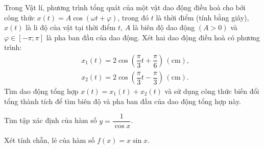 \begin{bt}%
	Trong Vật lí, phương trình tổng quát của một vật dao động điều hoà cho bởi công thức $x(t)=A \cos (\omega t+\varphi)$, trong đó $t$ là thời điểm (tính bằng giây), $x(t)$ là li độ của vật tại thời điểm $t$, $A$ là biên độ dao động $(A>0)$ và $\varphi \in[-\pi ; \pi]$ là pha ban đầu của dao động. Xét hai dao động điều hoà có phương trình:
	$$
	\begin{aligned}
		& x_1(t)=2 \cos \left(\dfrac{\pi}{3} t+\dfrac{\pi}{6}\right)\,(\mathrm{cm}), \\
		& x_2(t)=2 \cos \left(\dfrac{\pi}{3} t-\dfrac{\pi}{3}\right)\,(\mathrm{cm}) .
	\end{aligned}
	$$
	Tìm dao động tổng hợp $x(t)=x_1(t)+x_2(t)$ và sử dụng công thức biến đổi tổng thành tích để tìm biên độ và pha ban đầu của dao động tổng hợp này.
\end{bt}

\begin{vd}%
Tim tập xác định của hàm số $y=\dfrac{1}{\cos x}$.
\end{vd}

\begin{vd}%
Xét tính chẵn, lẻ của hàm số $f(x)=x \sin x$.
\end{vd}

